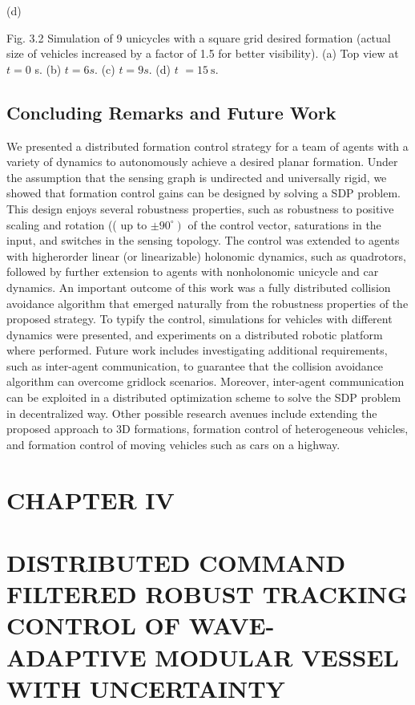 \documentclass[10pt]{article}
\begin{document}
(d)

Fig. 3.2 Simulation of 9 unicycles with a square grid desired formation (actual size of vehicles increased by a factor of 1.5 for better visibility). (a) Top view at $t=0$ s. (b) $t=6 s$. (c) $t=9 s$. (d) $t$ $=15 \mathrm{~s}$.

\subsection{Concluding Remarks and Future Work}
We presented a distributed formation control strategy for a team of agents with a variety of dynamics to autonomously achieve a desired planar formation. Under the assumption that the sensing graph is undirected and universally rigid, we showed that formation control gains can be designed by solving a SDP problem. This design enjoys several robustness properties, such as robustness to positive scaling and rotation (( up to $\left.\pm 90^{\circ}\right)$ of the control vector, saturations in the input, and switches in the sensing topology. The control was extended to agents with higherorder linear (or linearizable) holonomic dynamics, such as quadrotors, followed by further extension to agents with nonholonomic unicycle and car dynamics. An important outcome of this work was a fully distributed collision avoidance algorithm that emerged naturally from the robustness properties of the proposed strategy. To typify the control, simulations for vehicles with different dynamics were presented, and experiments on a distributed robotic platform where performed. Future work includes investigating additional requirements, such as inter-agent communication, to guarantee that the collision avoidance algorithm can overcome gridlock scenarios. Moreover, inter-agent communication can be exploited in a distributed optimization scheme to solve the SDP problem in decentralized way. Other possible research avenues include extending the proposed approach to 3D formations, formation control of heterogeneous vehicles, and formation control of moving vehicles such as cars on a highway.

\section*{CHAPTER IV }
\section{DISTRIBUTED COMMAND FILTERED ROBUST TRACKING CONTROL OF WAVE-ADAPTIVE MODULAR VESSEL WITH UNCERTAINTY}
\end{document}
